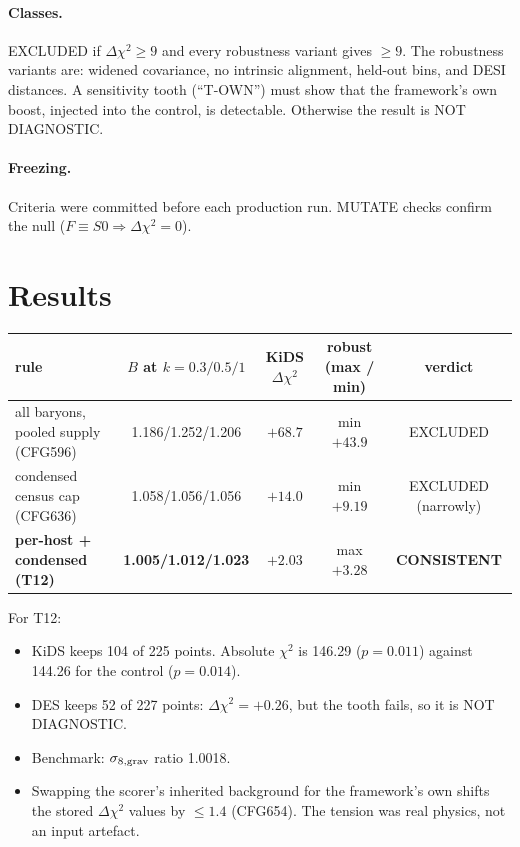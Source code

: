 \documentclass[10pt]{article}
\begin{document}
\paragraph{Classes.} EXCLUDED if $\Delta\chi^2\ge9$ and every robustness variant gives $\ge9$. The robustness variants are: widened covariance, no intrinsic alignment, held-out bins, and DESI distances. A sensitivity tooth (``T-OWN'') must show that the framework's own boost, injected into the control, is detectable. Otherwise the result is NOT DIAGNOSTIC.
\paragraph{Freezing.} Criteria were committed before each production run. MUTATE checks confirm the null ($F\equiv S0\Rightarrow\Delta\chi^2=0$).

\section{Results}
\begin{center}
\begin{tabular}{lcccc}
\toprule
rule & $B$ at $k=0.3/0.5/1$ & KiDS $\Delta\chi^2$ & robust (max / min) & verdict\\
\midrule
all baryons, pooled supply (CFG596) & 1.186/1.252/1.206 & $+68.7$ & min $+43.9$ & EXCLUDED\\
condensed census cap (CFG636) & 1.058/1.056/1.056 & $+14.0$ & min $+9.19$ & EXCLUDED (narrowly)\\
\textbf{per-host + condensed (T12)} & \textbf{1.005/1.012/1.023} & $\mathbf{+2.03}$ & max $+3.28$ & \textbf{CONSISTENT}\\
\bottomrule
\end{tabular}
\end{center}

For T12:
\begin{itemize}
\item KiDS keeps 104 of 225 points. Absolute $\chi^2$ is 146.29 ($p=0.011$) against 144.26 for the control ($p=0.014$).
\item DES keeps 52 of 227 points: $\Delta\chi^2=+0.26$, but the tooth fails, so it is NOT DIAGNOSTIC.
\item Benchmark: $\sigma_{8,{\rm grav}}$ ratio 1.0018.
\item Swapping the scorer's inherited background for the framework's own shifts the stored $\Delta\chi^2$ values by $\le1.4$ (CFG654). The tension was real physics, not an input artefact.
\end{itemize}
\end{document}
